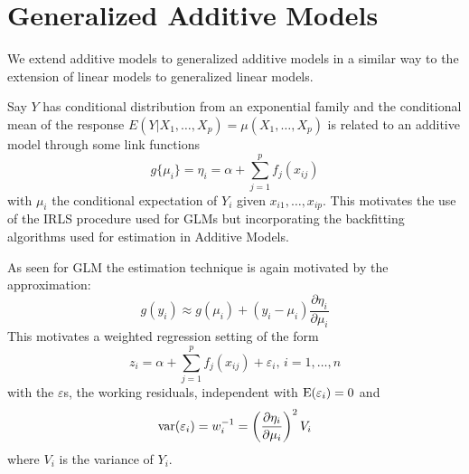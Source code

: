 \section{Generalized Additive Models}
We extend additive models to generalized additive models in a similar
way to the extension of linear models to generalized linear models.

Say $Y$ has conditional distribution from an exponential family and the
conditional mean of
the response $E(Y|X_1,\dots,X_p) = \mu(X_1,\dots,X_p)$ is related to
an additive  model through some link functions
\[
g\{\mu_i\} = \eta_i = \alpha + \sum_{j=1}^p f_j(x_{ij}) 
\]
with $\mu_i$ the conditional expectation of $Y_i$ given
$x_{i1},\dots,x_{ip}$. This motivates the use of the IRLS procedure used
for GLMs but  incorporating the backfitting algorithms used for
estimation in Additive Models. 

As seen for GLM the estimation technique is again motivated by the
approximation:
\[
g(y_i) \approx g(\mu_i) + (y_i - \mu_i) \frac{\partial \eta_i}{\partial
  \mu_i}
\]
This motivates a weighted regression setting of the form
\[
z_i = \alpha + \sum_{j=1}^p f_j(x_{ij}) + \varepsilon_i, \, i=1,\dots,n
\]
with the $\varepsilon$s, the working residuals,  independent with
$\mbox{E}(\varepsilon_i) =0$ and 
\[
\mbox{var}(\varepsilon_i) = w_i^{-1} = \left( \frac{\partial \eta_i}{\partial
    \mu_i} \right)^2 V_i
\]
where $V_i$ is the variance of $Y_i$.

